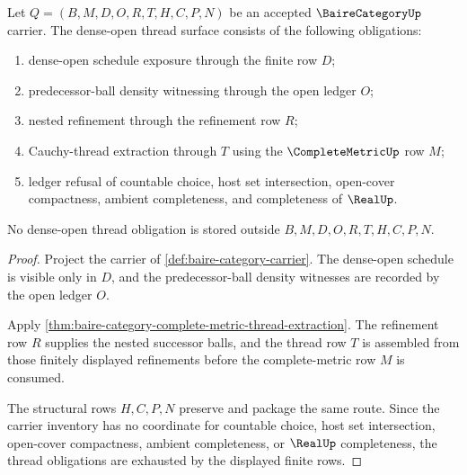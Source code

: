 \begin{theorem}
\label{thm:baire-category-dense-open-thread-obligations}
Let $Q=(B,M,D,O,R,T,H,C,P,N)$ be an accepted $\BaireCategoryUp$ carrier. The dense-open thread surface consists of the following obligations:
\begin{enumerate}
\item dense-open schedule exposure through the finite row $D$;
\item predecessor-ball density witnessing through the open ledger $O$;
\item nested refinement through the refinement row $R$;
\item Cauchy-thread extraction through $T$ using the $\CompleteMetricUp$ row $M$;
\item ledger refusal of countable choice, host set intersection, open-cover compactness, ambient completeness, and completeness of $\RealUp$.
\end{enumerate}
No dense-open thread obligation is stored outside $B,M,D,O,R,T,H,C,P,N$.
\end{theorem}
\begin{proof}
Project the carrier of \autoref{def:baire-category-carrier}. The dense-open schedule is visible only in $D$, and the predecessor-ball density witnesses are recorded by the open ledger $O$.

Apply \autoref{thm:baire-category-complete-metric-thread-extraction}. The refinement row $R$ supplies the nested successor balls, and the thread row $T$ is assembled from those finitely displayed refinements before the complete-metric row $M$ is consumed.

The structural rows $H,C,P,N$ preserve and package the same route. Since the carrier inventory has no coordinate for countable choice, host set intersection, open-cover compactness, ambient completeness, or $\RealUp$ completeness, the thread obligations are exhausted by the displayed finite rows.
\end{proof}

